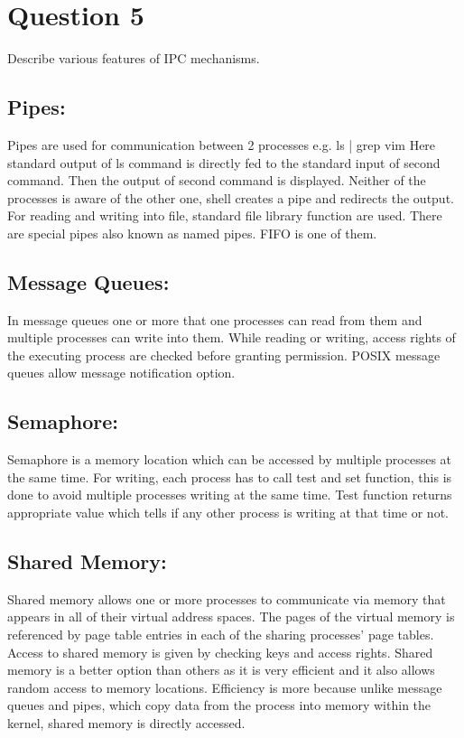 \documentclass[main.tex]{subfiles}
\begin{document}
\section{Question 5}

Describe various features of IPC mechanisms.


\subsection{Pipes:}

Pipes are used for communication between 2 processes e.g. ls | grep vim
Here standard output of ls command is directly fed to the standard input of second
command. Then the output of second command is displayed.
Neither of the processes is aware of the other one, shell creates a pipe and
redirects the output. For reading and writing into file, standard file library
function are used. There are special pipes also known as named pipes. FIFO is
one of them.

\subsection{Message Queues:}

In message queues one or more that one processes can read from them and multiple
processes can write into them.	While reading or writing, access rights of the
executing process are checked before granting permission. POSIX message queues
allow message notification option.

\subsection{Semaphore:}

Semaphore is a memory location which can be accessed by multiple processes at
the same time. For writing, each process has to call test and set function, this
is done to avoid multiple processes writing at the same time. Test function
returns appropriate value which tells if any other process is writing at that
time or not.

\subsection{Shared Memory:}

Shared memory allows one or more processes to communicate via memory that
appears in all of their virtual address spaces. The pages of the virtual memory
is referenced by page table entries in each of the sharing processes' page
tables. Access to shared memory is given by checking keys and access rights.
Shared memory is a better option than others as it is very efficient and it also
allows random access to memory locations. Efficiency is more because unlike
message queues and pipes, which copy data from the process into memory within
the kernel, shared memory is directly accessed.

\clearpage
\end{document}
